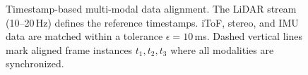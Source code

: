 \begin{figure}[t]
\caption{Timestamp-based multi-modal data alignment. The LiDAR stream
(10--20\,Hz) defines the reference timestamps. iToF, stereo, and IMU data
are matched within a tolerance $\epsilon = 10$\,ms. Dashed vertical lines
mark aligned frame instances $t_1, t_2, t_3$ where all modalities are
synchronized.}
\label{fig:data_alignment}
\end{figure}
